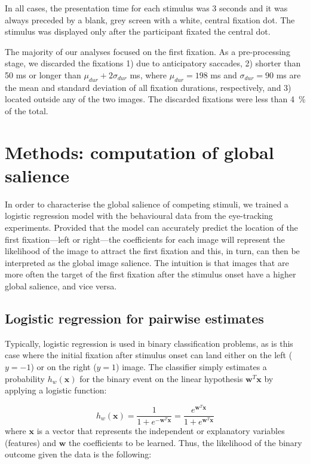 {In all cases, the presentation time for each stimulus was 3 seconds and it was always preceded by a blank, grey screen with a white, central fixation dot. The stimulus was displayed only after the participant fixated the central dot. 

The majority of our analyses focused on the first fixation. As a pre-processing stage, we discarded the fixations 1) due to anticipatory saccades, 2) shorter than 50 ms or longer than $\mu_{dur} + 2 \sigma_{dur}$ ms, where $\mu_{dur} = 198$ ms and $\sigma_{dur} = 90$ ms are the mean and standard deviation of all fixation durations, respectively, and 3) located outside any of the two images. The discarded fixations were less than 4~\% of the total.

\section{Methods: computation of global salience}
\label{sec:globsal}
In order to characterise the global salience of competing stimuli, we trained a logistic regression model with the behavioural data from the eye-tracking experiments. Provided that the model can accurately predict the location of the first fixation---left or right---the coefficients for each image will represent the likelihood of the image to attract the first fixation and this, in turn, can then be interpreted as the global image salience. The intuition is that images that are more often the target of the first fixation after the stimulus onset have a higher global salience, and vice versa.

\subsection{Logistic regression for pairwise estimates}
\label{sec:globsal-logreg_plain}
Typically, logistic regression is used in binary classification problems, as is this case where the initial fixation after stimulus onset can land either on the left ($y = -1$) or on the right ($y = 1$) image. The classifier simply estimates a probability $h_{w}(\mathbf{x})$ for the binary event on the linear hypothesis $\mathbf{w}^{T}\mathbf{x}$ by applying a logistic function:

\begin{equation}
\label{eq:logreg}
 h_{w}(\mathbf{x}) = \frac{1}{1 + e^{-\mathbf{w}^{T}\mathbf{x}}} = \frac{e^{\mathbf{w}^{T}\mathbf{x}}}{1 + e^{\mathbf{w}^{T}\mathbf{x}}}
\end{equation}
%
where $\mathbf{x}$ is a vector that represents the independent or explanatory variables (features) and $\mathbf{w}$ the coefficients to be learned. Thus, the likelihood of the binary outcome given the data is the following:

}
